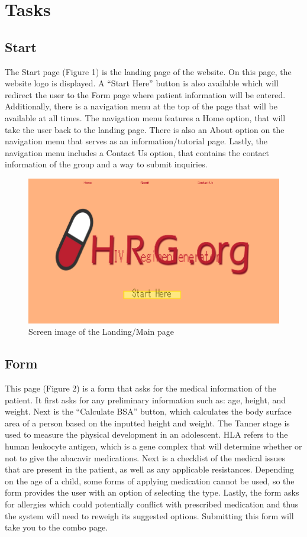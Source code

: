 \documentclass[12pt]{article}
\begin{document}
\section{Tasks}
\subsection{Start}
The Start page (Figure 1) is the landing page of the website. On this page, the website logo is displayed. A “Start Here” button is also available which will redirect the user to the Form page where patient information will be entered. Additionally, there is a navigation menu at the top of the page that will be available at all times. The navigation menu features a Home option, that will take the user back to the landing page. There is also an About option on the navigation menu that serves as an information/tutorial page. Lastly, the navigation menu includes a Contact Us option, that contains the contact information of the group and a way to submit inquiries.

\begin{figure}[H]
  \centering
  \includegraphics[width=\linewidth]{landing.png}
 \caption{Screen image of the Landing/Main page}
  \label{fig:landing}
\end{figure}

\subsection{Form}
This page (Figure 2) is a form that asks for the medical information of the patient. It first asks for any preliminary information such as: age, height, and weight. Next is the “Calculate BSA” button, which calculates the body surface area of a person based on the inputted height and weight. The Tanner stage is used to measure the physical development in an adolescent. HLA refers to the human leukocyte antigen, which is a gene complex that will determine whether or not to give the abacavir medications. Next is a checklist of the medical issues that are present in the patient, as well as any applicable resistances. Depending on the age of a child, some forms of applying medication cannot be used, so the form provides the user with an option of selecting the type. Lastly, the form asks for allergies which could potentially conflict with prescribed medication and thus the system will need to reweigh its suggested options. Submitting this form will take you to the combo page.
\end{document}
